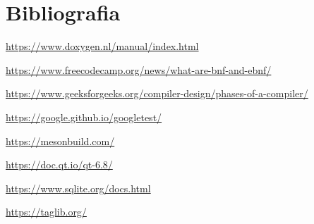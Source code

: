 \documentclass[12pt]{report}
\begin{document}
\chapter{Bibliografia}

\url{https://www.doxygen.nl/manual/index.html}

\url{https://www.freecodecamp.org/news/what-are-bnf-and-ebnf/}

\url{https://www.geeksforgeeks.org/compiler-design/phases-of-a-compiler/}

\url{https://google.github.io/googletest/}

\url{https://mesonbuild.com/}

\url{https://doc.qt.io/qt-6.8/}

\url{https://www.sqlite.org/docs.html}

\url{https://taglib.org/}
\end{document}
